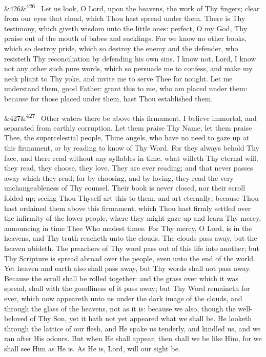 \documentclass[12pt]{article}
\newcommand{\para}[1][]{\par\noindent\ifx&#1&\else\textsuperscript{\footnotesize #1}~\fi}
\begin{document}
\para[426] Let us look, O Lord, upon the heavens, the work of Thy fingers; clear from our eyes that cloud, which Thou hast spread under them. There is Thy testimony, which giveth wisdom unto the little ones: perfect, O my God, Thy praise out of the mouth of babes and sucklings. For we know no other books, which so destroy pride, which so destroy the enemy and the defender, who resisteth Thy reconciliation by defending his own sins. I know not, Lord, I know not any other such pure words, which so persuade me to confess, and make my neck pliant to Thy yoke, and invite me to serve Thee for nought. Let me understand them, good Father: grant this to me, who am placed under them: because for those placed under them, hast Thou established them.

\para[427] Other waters there be above this firmament, I believe immortal, and separated from earthly corruption. Let them praise Thy Name, let them praise Thee, the supercelestial people, Thine angels, who have no need to gaze up at this firmament, or by reading to know of Thy Word. For they always behold Thy face, and there read without any syllables in time, what willeth Thy eternal will; they read, they choose, they love. They are ever reading; and that never passes away which they read; for by choosing, and by loving, they read the very unchangeableness of Thy counsel. Their book is never closed, nor their scroll folded up; seeing Thou Thyself art this to them, and art eternally; because Thou hast ordained them above this firmament, which Thou hast firmly settled over the infirmity of the lower people, where they might gaze up and learn Thy mercy, announcing in time Thee Who madest times. For Thy mercy, O Lord, is in the heavens, and Thy truth reacheth unto the clouds. The clouds pass away, but the heaven abideth. The preachers of Thy word pass out of this life into another; but Thy Scripture is spread abroad over the people, even unto the end of the world. Yet heaven and earth also shall pass away, but Thy words shall not pass away. Because the scroll shall be rolled together: and the grass over which it was spread, shall with the goodliness of it pass away; but Thy Word remaineth for ever, which now appeareth unto us under the dark image of the clouds, and through the glass of the heavens, not as it is: because we also, though the well-beloved of Thy Son, yet it hath not yet appeared what we shall be. He looketh through the lattice of our flesh, and He spake us tenderly, and kindled us, and we ran after His odours. But when He shall appear, then shall we be like Him, for we shall see Him as He is. As He is, Lord, will our sight be.
\end{document}
